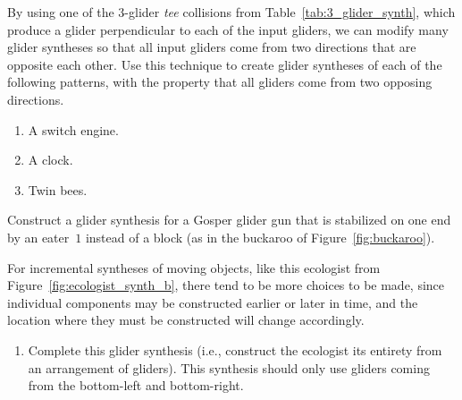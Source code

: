 \begin{multicols}{2}
\begin{problemstar}
\begin{enumerate}[label=\bf\color{ocre}(\alph*)]
		\end{enumerate}
	\end{problemstar}
	
	
	\mfilbreak
	
	
	\begin{problemstar}\label{exer:glider_synth_tee}
		By using one of the $3$-glider \emph{tee} collisions from Table~\ref{tab:3_glider_synth}, which produce a glider perpendicular to each of the input gliders, we can modify many glider syntheses so that all input gliders come from two directions that are opposite each other. Use this technique to create glider syntheses of each of the following patterns, with the property that all gliders come from two opposing directions.
		\begin{enumerate}[label=\bf\color{ocre}(\alph*)]
			\item A switch engine.
			
			\item A clock.
			
			\item Twin bees.
		\end{enumerate}
	\end{problemstar}
	
	
	\mfilbreak
	
	
	\begin{problem}\label{exer:ggg_stabilized_by_eater_synthesis}
		Construct a glider synthesis for a Gosper glider gun that is stabilized on one end by an eater~$1$ instead of a block (as in the buckaroo of Figure~\ref{fig:buckaroo}).
	\end{problem}
	
	
	\mfilbreak
	
	
	\begin{problem}\label{exer:ecologist_synth}
		For incremental syntheses of moving objects, like this ecologist from Figure~\ref{fig:ecologist_synth_b}, there tend to be more choices to be made, since individual components may be constructed earlier or later in time, and the location where they must be constructed will change accordingly.\smallskip
		
		\begin{enumerate}[label=\bf\color{ocre}(\alph*)]
			\item Complete this glider synthesis (i.e., construct the ecologist its entirety from an arrangement of gliders). This synthesis should only use gliders coming from the bottom-left and bottom-right.
			

\end{enumerate}
\end{problem}
\end{multicols}
